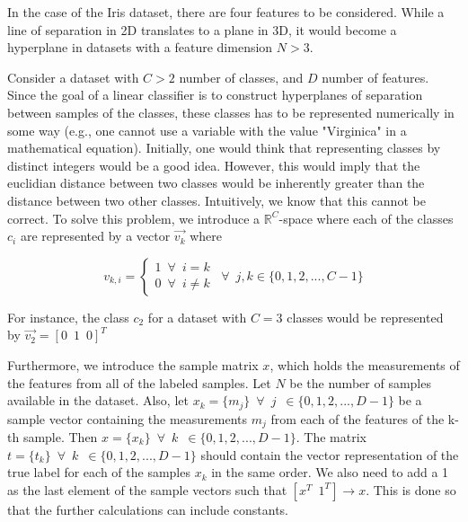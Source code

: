 \documentclass{article}
\begin{document}
In the case of the Iris dataset, there are four features to be considered. While a line of separation
in 2D translates to a plane in 3D, it would become a hyperplane in datasets with a feature dimension
$N > 3$.

Consider a dataset with $C > 2$ number of classes, and $D$ number of features. Since the goal of
a linear classifier is to construct hyperplanes of separation between samples of the classes,
these classes has to be represented numerically in some way (e.g., one cannot use a variable
with the value "Virginica" in a mathematical equation). Initially, one would think that
representing classes by distinct integers would be a good idea. However, this would imply
that the euclidian distance between two classes would be inherently greater than the distance
between two other classes. Intuitively, we know that this cannot be correct. To solve this problem,
we introduce a $\mathbb{R}^C$-space where each of the classes $c_i$ are represented by a vector $\vec{v_k}$ where

\begin{equation}
    v_{k,i} = \begin{cases}
        1 \enspace \forall \enspace i = k \\
        0 \enspace \forall \enspace i \neq k
    \end{cases} \enspace \forall \enspace j,k \in \{0, 1, 2, ..., C - 1\}\label{eq:class_vector}
\end{equation}

For instance, the class $c_2$ for a dataset with $C=3$ classes would be represented by
$\vec{v_2} = [ 0\enspace 1\enspace  0 ]^T$

Furthermore, we introduce the sample matrix $x$, which holds the measurements of the features from
all of the labeled samples. Let $N$ be the number of samples available in the dataset. Also,
let $x_k = \{m_j\} \enspace \forall \enspace j \enspace \in \{0, 1, 2, ..., D - 1\}$ be a sample vector containing
the measurements $m_j$ from each of the features of the k-th sample. Then $x = \{x_k\} \enspace \forall \enspace k \enspace
\in \{0, 1, 2, ..., D - 1\}$. The matrix $t = \{t_k\} \enspace \forall \enspace k \enspace
\in \{0, 1, 2, ..., D - 1\}$ should contain the vector representation of the true label for each of the samples
$x_k$ in the same order. We also need to add a 1 as the last element of the sample vectors such that
$[ x^T \enspace 1 ^T ] \rightarrow x$. This is done so that the further calculations can include constants.
\end{document}
